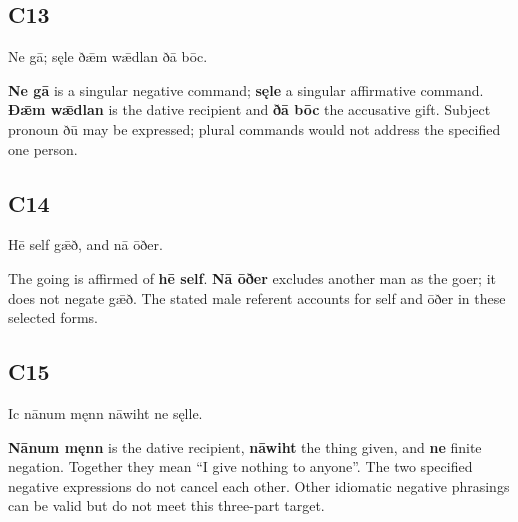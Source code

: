 \subsection*{C13}

\par\begin{minipage}{\linewidth}\raggedright
Ne gā; sęle ðǣm wǣdlan ðā bōc.

\textbf{Ne gā} is a singular negative command; \textbf{sęle} a singular affirmative command. \textbf{Ðǣm wǣdlan} is the dative recipient and \textbf{ðā bōc} the accusative gift. Subject pronoun ðū may be expressed; plural commands would not address the specified one person.

\end{minipage}\par\addvspace{4pt}

\subsection*{C14}

\par\begin{minipage}{\linewidth}\raggedright
Hē self gǣð, and nā ōðer.

The going is affirmed of \textbf{hē self}. \textbf{Nā ōðer} excludes another man as the goer; it does not negate gǣð. The stated male referent accounts for self and ōðer in these selected forms.

\end{minipage}\par\addvspace{4pt}

\subsection*{C15}

\par\begin{minipage}{\linewidth}\raggedright
Ic nānum męnn nāwiht ne sęlle.

\textbf{Nānum męnn} is the dative recipient, \textbf{nāwiht} the thing given, and \textbf{ne} finite negation. Together they mean “I give nothing to anyone”. The two specified negative expressions do not cancel each other. Other idiomatic negative phrasings can be valid but do not meet this three-part target.

\end{minipage}\par\addvspace{4pt}

